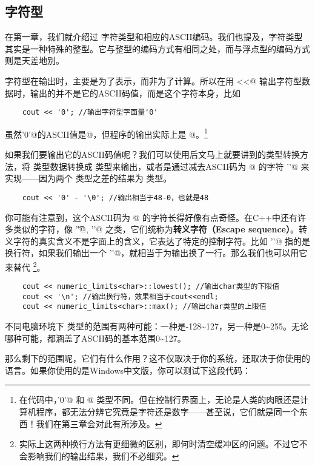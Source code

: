 \subsection*{字符型}
在第一章，我们就介绍过 \lstinline@char@ 字符类型和相应的ASCII编码。我们也提及，字符类型其实是一种特殊的整型。它与整型的编码方式有相同之处，而与浮点型的编码方式则是天差地别。\par
字符型在输出时，主要是为了表示，而非为了计算。所以在用 \lstinline@cout<<@ 输出字符型数据时，输出的并不是它的ASCII码值，而是这个字符本身，比如
\begin{lstlisting}
    cout << '0'; //输出字符型字面量'0'
\end{lstlisting}
虽然\lstinline@'0'@的ASCII值是@，但程序的输出实际上是 @。\footnote{在代码中，\lstinline@'0'@ 和 @ 类型不同。但在控制行界面上，无论是人类的肉眼还是计算机程序，都无法分辨它究竟是字符还是数字——甚至说，它们就是同一个东西！我们在第三章会对此有所涉及。}\par
如果我们要输出它的ASCII码值呢？我们可以使用后文马上就要讲到的类型转换方法，将 \lstinline@char@ 类型数据转换成 \lstinline@int@ 类型来输出，或者是通过减去ASCII码为 @ 的字符 \lstinline@'\0'@ 来实现——因为两个 \lstinline@char@ 类型之差的结果为 \lstinline@int@ 类型。
\begin{lstlisting}
    cout << '0' - '\0'; //输出相当于48-0，也就是48
\end{lstlisting}\par
你可能有注意到，这个ASCII码为 @ 的字符长得好像有点奇怪。在C++中还有许多类似的字符，像 \lstinline@'\t'@, \lstinline@'\n'@ 之类，它们统称为\textbf{转义字符（Escape sequence）}。转义字符的真实含义不是字面上的含义，它表达了特定的控制字符。比如 \lstinline@'\n'@ 指的是换行符，如果我们输出一个 \lstinline@'\n'@，就相当于为输出换了一行。那么我们也可以用它来替代 \lstinline@endl@\footnote{实际上这两种换行方法有更细微的区别，即何时清空缓冲区的问题。不过它不会影响我们的输出结果，我们不必细究。}。
\begin{lstlisting}
    cout << numeric_limits<char>::lowest(); //输出char类型的下限值
    cout << '\n'; //输出换行符，效果相当于cout<<endl;
    cout << numeric_limits<char>::max(); //输出char类型的上限值
\end{lstlisting}\par
不同电脑环境下 \lstinline@char@ 类型的范围有两种可能：一种是-128\~{}127，另一种是0\~{}255。无论哪种可能，都涵盖了ASCII码的基本范围0\~{}127。\par
那么剩下的范围呢，它们有什么作用？这不仅取决于你的系统，还取决于你使用的语言。如果你使用的是Windows中文版，你可以测试下这段代码：
